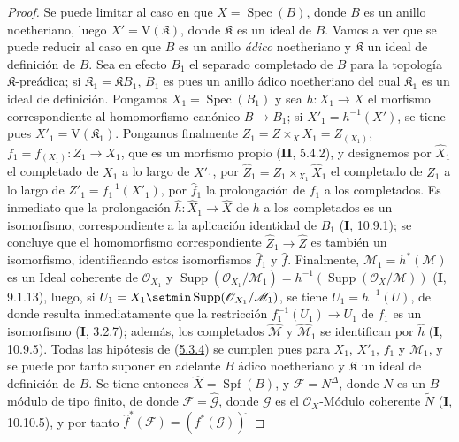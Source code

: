 \begin{proof}
Se puede limitar al caso en que $X=\operatorname{Spec}(B)$, donde $B$ es un anillo
noetheriano, luego $X'=\mathrm V(\mathfrak K)$, donde $\mathfrak K$ es un ideal de
$B$. Vamos a ver que se puede reducir al caso en que $B$ es un anillo \emph{ádico}
noetheriano y $\mathfrak K$ un ideal de definición de $B$. Sea en efecto $B_1$ el
separado completado de $B$ para la topología $\mathfrak K$-preádica; si
$\mathfrak K_1=\mathfrak K B_1$, $B_1$ es pues un
anillo ádico noetheriano del cual $\mathfrak K_1$ es un ideal de definición. Pongamos
$X_1=\operatorname{Spec}(B_1)$ y sea $h:X_1\to X$ el morfismo correspondiente al
homomorfismo canónico $B\to B_1$; si $X'_1=h^{-1}(X')$, se tiene pues
$X'_1=\mathrm V(\mathfrak K_1)$. Pongamos finalmente
$Z_1=Z\times_X X_1=Z_{(X_1)}$, $f_1=f_{(X_1)}:Z_1\to X_1$, que es un morfismo
propio (\textbf{II}, 5.4.2), y designemos por $\widehat X_1$ el completado de $X_1$ a lo largo
de $X'_1$, por
$\widehat Z_1=Z_1\times_{X_1}\widehat X_1$ el completado de $Z_1$ a lo largo de
$Z'_1=f_1^{-1}(X'_1)$, por $\widehat f_1$ la prolongación de $f_1$ a los completados.
Es inmediato que la prolongación $\widehat h:\widehat X_1\to\widehat X$ de $h$
a los completados es un isomorfismo, correspondiente a la aplicación identidad de $B_1$
(\textbf{I}, 10.9.1); se concluye que el homomorfismo correspondiente
$\widehat Z_1\to\widehat Z$ es también un isomorfismo, identificando estos isomorfismos
$\widehat f_1$ y $\widehat f$. Finalmente,
$\mathcal M_1=h^*(\mathcal M)$ es un Ideal coherente de $\mathcal O_{X_1}$ y
$\operatorname{Supp}(\mathcal O_{X_1}/\mathcal M_1)
=h^{-1}(\operatorname{Supp}(\mathcal O_X/\mathcal M))$
(\textbf{I}, 9.1.13), luego, si
$U_1=X_1\setmin\operatorname{Supp}(\mathcal O_{X_1}/\mathcal M_1)$, se tiene
$U_1=h^{-1}(U)$, de donde resulta inmediatamente que la restricción
$f_1^{-1}(U_1)\to U_1$ de $f_1$ es un isomorfismo (\textbf{I}, 3.2.7); además, los
completados $\widehat{\mathcal M}$ y $\widehat{\mathcal M}_1$ se identifican por
$\widehat h$ (\textbf{I}, 10.9.5). Todas las hipótesis de
(\hyperref[III.5.3.4-fr]{5.3.4}) se cumplen pues para $X_1$, $X'_1$, $f_1$ y
$\mathcal M_1$, y se puede por tanto suponer en adelante $B$ ádico noetheriano y
$\mathfrak K$ un ideal de definición de $B$. Se tiene entonces
$\widehat X=\operatorname{Spf}(B)$, y $\mathcal F=N^\Delta$, donde $N$ es un
$B$-módulo de tipo finito, de donde $\mathcal F=\widehat{\mathcal G}$, donde $\mathcal G$
es el $\mathcal O_X$-Módulo coherente $\widetilde N$ (\textbf{I}, 10.10.5), y por tanto
$\widehat f^{*}(\mathcal F)=(f^*(\mathcal G))^{\widehat{\,}}$

\end{proof}
